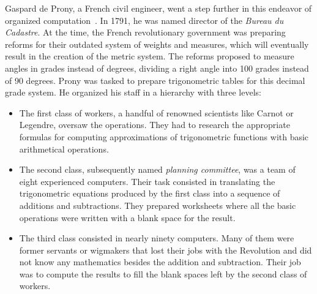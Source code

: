         Gaspard de Prony, a French civil engineer, went a step further in this endeavor of organized
        computation~\cite[Chapter~2]{human_computers}. In 1791, he was named director of the \emph{Bureau du Cadastre}.
        At the time, the French revolutionary government was preparing reforms for their outdated system of weights and
        measures, which will eventually result in the creation of the metric system. The reforms proposed to measure
        angles in grades instead of degrees, dividing a right angle into 100 grades instead of 90 degrees. Prony was
        tasked to prepare trigonometric tables for this decimal grade system. He organized his staff in a hierarchy with
        three levels:
        \begin{itemize}
            \item The first class of workers, a handful of renowned scientists like Carnot or Legendre, oversaw the
                operations. They had to research the appropriate formulas for computing approximations of trigonometric
                functions with basic arithmetical operations.
            \item The second class, subsequently named \emph{planning committee}, was a team of eight experienced
                computers. Their task consisted in translating the trigonometric equations produced by the first class
                into a sequence of additions and subtractions. They prepared worksheets where all the basic operations
                were written with a blank space for the result.
            \item The third class consisted in nearly ninety computers. Many of them were former servants or wigmakers
                that lost their jobs with the Revolution and did not know any mathematics besides the addition and
                subtraction. Their job was to compute the results to fill the blank spaces left by the second class of
                workers.
        \end{itemize}

